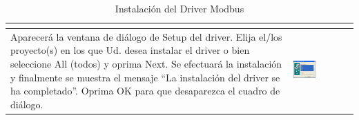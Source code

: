 \begin{table}[H]
\begin{tabular}{*{2}{m{}}}
\begin{center}
  \end{center}\\
\hline 
  Aparecerá la ventana de diálogo de Setup del driver.
  Elija el/los proyecto(s) en los que Ud. desea instalar el driver o bien 
  seleccione All (todos) y oprima Next.
  Se efectuará la instalación y finalmente se muestra el mensaje ``La
  instalación  del driver se ha completado''. Oprima OK para que desaparezca el
  cuadro de diálogo.
  &\begin{center}
    \includegraphics[width=0.4\textwidth]
    {Cap5-SCADA/images/installDriver2.jpeg}
  \end{center}\\
\hline
\end{tabular}
\caption{Instalación del Driver Modbus}
\label{tab:installModbus}
\end{table}

